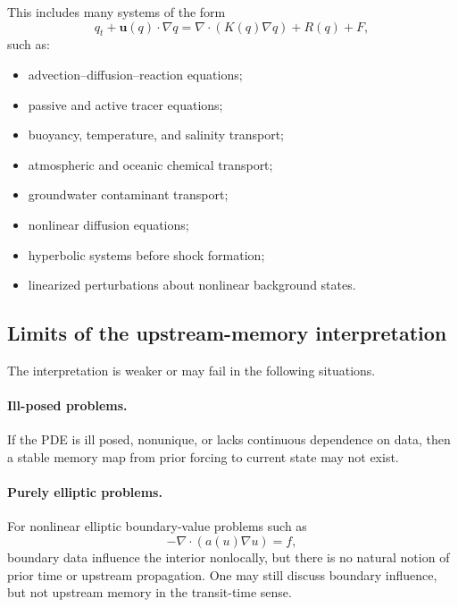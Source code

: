 \documentclass[10pt]{amsart}
\begin{document}
This includes many systems of the form
\begin{equation}
q_t+\mathbf u(q)\cdot\nabla q
=
\nabla\cdot(K(q)\nabla q)+R(q)+F,
\end{equation}
such as:
\begin{itemize}
\item advection--diffusion--reaction equations;
\item passive and active tracer equations;
\item buoyancy, temperature, and salinity transport;
\item atmospheric and oceanic chemical transport;
\item groundwater contaminant transport;
\item nonlinear diffusion equations;
\item hyperbolic systems before shock formation;
\item linearized perturbations about nonlinear background states.
\end{itemize}

\subsection{Limits of the upstream-memory interpretation}

The interpretation is weaker or may fail in the following situations.

\paragraph{Ill-posed problems.}
If the PDE is ill posed, nonunique, or lacks continuous dependence on data, then a stable memory map from prior forcing to current state may not exist.

\paragraph{Purely elliptic problems.}
For nonlinear elliptic boundary-value problems such as
\begin{equation}
-\nabla\cdot(a(u)\nabla u)=f,
\end{equation}
boundary data influence the interior nonlocally, but there is no natural notion of prior time or upstream propagation. One may still discuss boundary influence, but not upstream memory in the transit-time sense.
\end{document}
